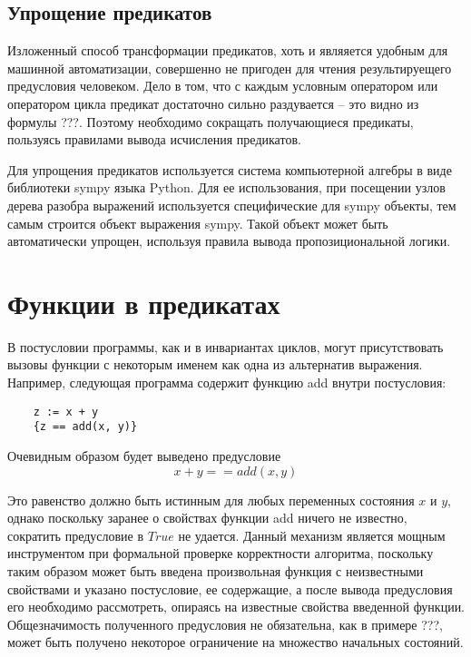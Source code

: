 \subsection{Упрощение предикатов}
Изложенный способ трансформации предикатов, хоть и являяется удобным для машинной автоматизации,
совершенно не пригоден для чтения результируещего предусловия человеком. Дело в том, что с каждым условным оператором
или оператором цикла предикат достаточно сильно раздувается -- это видно из формулы ???. Поэтому необходимо
сокращать получающиеся предикаты, пользуясь правилами вывода исчисления предикатов.

Для упрощения предикатов используется система компьютерной алгебры в виде библиотеки sympy языка Python.
Для ее использования, при посещении узлов дерева разобра выражений используется специфические для sympy
объекты, тем самым строится объект выражения sympy. Такой объект может быть автоматически упрощен,
используя правила вывода пропозициональной логики.

\section{Функции в предикатах}
В постусловии программы, как и в инвариантах циклов, могут присутствовать вызовы функции с некоторым именем как
одна из альтернатив выражения. Например, следующая программа содержит функцию add внутри постусловия:
\begin{verbatim}
    z := x + y
    {z == add(x, y)}
\end{verbatim}

Очевидным образом будет выведено предусловие 
\begin{equation}
    x + y == add(x, y)
\end{equation}

Это равенство должно быть истинным для любых переменных состояния $x$ и $y$, однако поскольку заранее о свойствах функции
add ничего не известно, сократить предусловие в $True$ не удается. Данный механизм является мощным инструментом при 
формальной проверке корректности алгоритма, поскольку таким образом может быть введена произвольная функция
с неизвестными свойствами и указано постусловие, ее содержащие, а после вывода предусловия его необходимо рассмотреть,
опираясь на известные свойства введенной функции. Общезначимость полученного предусловия не обязательна, как в примере ???,
может быть получено некоторое ограничение на множество начальных состояний.


